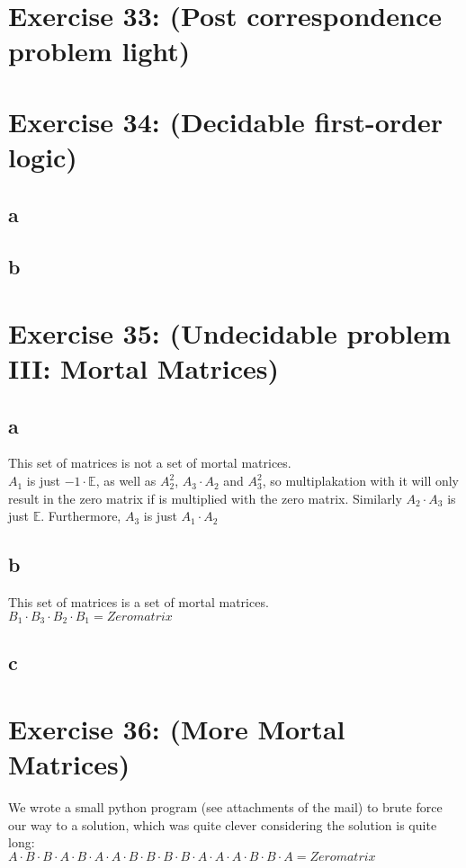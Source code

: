 \documentclass[12pt]{article}
\begin{document}
 

\rhead{\today}


\section*{Exercise 33: (Post correspondence problem light)}

\section*{Exercise 34: (Decidable first-order logic)}
\subsection*{a}
\subsection*{b}

\section*{Exercise 35: (Undecidable problem III: Mortal Matrices)}
\subsection*{a}
This set of matrices is not a set of mortal matrices.\\
$A_1$ is just $-1 \cdot \mathbb{E}$, as well as $A_2^2$, $A_3 \cdot A_2$ and $A_3^2$, so multiplakation with it will only result in the zero matrix if is multiplied with the zero matrix. Similarly $A_2 \cdot A_3$ is just $\mathbb{E}$. Furthermore, $A_3$ is just $A_1 \cdot A_2$

\subsection*{b}
This set of matrices is a set of mortal matrices.\\

$ B_1 \cdot B_3 \cdot B_2 \cdot B_1 = Zeromatrix$

\subsection*{c}



\section*{Exercise 36: (More Mortal Matrices)}

We wrote a small python program (see attachments of the mail) to brute force our way to a solution, which was quite clever considering the solution is quite long:\\

$A \cdot B \cdot B \cdot A \cdot B \cdot A \cdot A \cdot B \cdot B \cdot B \cdot B \cdot A \cdot A \cdot A \cdot B \cdot B \cdot A = Zeromatrix$


\end{document}
